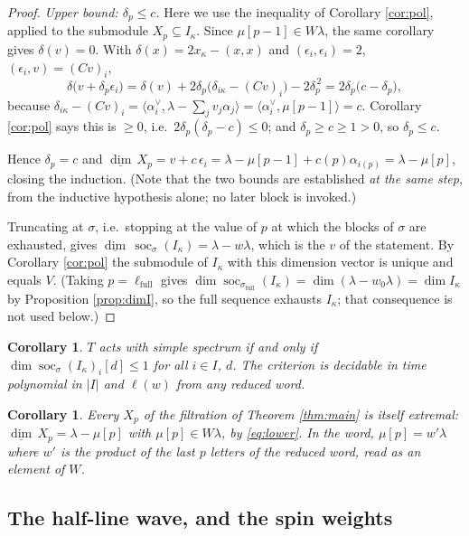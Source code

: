\documentclass[reqno]{amsart}
\theoremstyle{plain}
\newtheorem{corollary}[theorem]{Corollary}
\theoremstyle{definition}
\DeclareMathOperator{\soc}{soc}
\newcommand{\dimv}{\underline{\dim}\,}
\newcommand{\la}{\lambda}
\newcommand{\al}{\alpha}
\newcommand{\ka}{\kappa}
\begin{document}
\begin{proof}
\emph{Upper bound: $\delta_p\le c$.}  Here we use the inequality of Corollary
\ref{cor:pol}, applied to the submodule $X_p\subseteq I_\ka$.  Since
$\mu[p-1]\in W\la$, the same corollary gives $\delta(v)=0$.  With
$\delta(x)=2x_\ka-(x,x)$ and $(\epsilon_i,\epsilon_i)=2$,
$(\epsilon_i,v)=(Cv)_i$,
\[
   \delta\bigl(v+\delta_p\epsilon_i\bigr)
   =\delta(v)+2\delta_p\bigl(\delta_{i\ka}-(Cv)_i\bigr)-2\delta_p^{\,2}
   =2\delta_p\bigl(c-\delta_p\bigr),
\]
because $\delta_{i\ka}-(Cv)_i=\langle\al_i^\vee,\la-\sum_jv_j\al_j\rangle
=\langle\al_i^\vee,\mu[p-1]\rangle=c$.  Corollary \ref{cor:pol} says this is
$\ge0$, i.e.\ $2\delta_p(\delta_p-c)\le0$; and $\delta_p\ge c\ge1>0$, so
$\delta_p\le c$.

Hence $\delta_p=c$ and
$\dimv X_p=v+c\,\epsilon_i=\la-\mu[p-1]+c(p)\al_{i(p)}=\la-\mu[p]$, closing the
induction.  (Note that the two bounds are established \emph{at the same step},
from the inductive hypothesis alone; no later block is invoked.)

Truncating at $\sigma$, i.e.\ stopping at the value of $p$ at which the blocks
of $\sigma$ are exhausted, gives $\dimv\soc_\sigma(I_\ka)=\la-w\la$, which is
the $v$ of the statement.  By
Corollary \ref{cor:pol} the submodule of $I_\ka$ with this dimension vector is
unique and equals $V$.  (Taking $p=\ell_{\mathrm{full}}$ gives
$\dim\soc_{\sigma_{\mathrm{full}}}(I_\ka)=\dim(\la-w_0\la)=\dim I_\ka$ by
Proposition \ref{prop:dimI}, so the full sequence exhausts $I_\ka$; that
consequence is not used below.)
\end{proof}

\begin{corollary}\label{cor:crit}
$T$ acts with simple spectrum if and only if
$\dim\soc_\sigma(I_\ka)_i[d]\le1$ for all $i\in I$, $d$.  The criterion is
decidable in time polynomial in $|I|$ and $\ell(w)$ from any reduced word.
\end{corollary}

\begin{corollary}\label{cor:prefix}
Every $X_p$ of the filtration of Theorem \ref{thm:main} is itself extremal:
$\dimv X_p=\la-\mu[p]$ with $\mu[p]\in W\la$, by \eqref{eq:lower}.  In the
word, $\mu[p]=w'\la$ where $w'$ is the product of the last $p$ letters of the
reduced word, read as an element of $W$.
\end{corollary}

\subsection{The half-line wave, and the spin weights}\label{ss:halfline}
\end{document}
